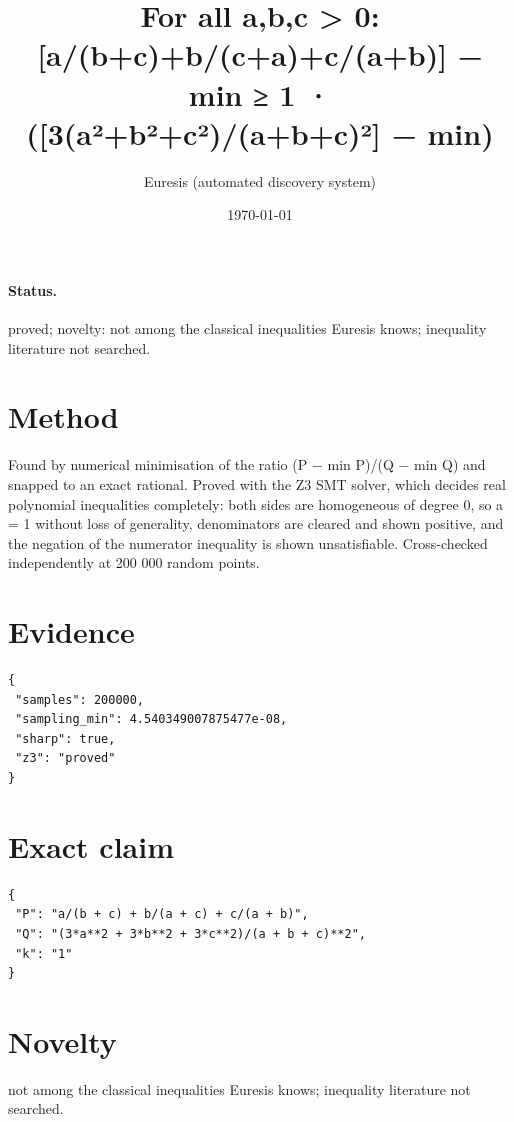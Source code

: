 \documentclass[11pt]{article}
\title{For all a,b,c > 0:  [a/(b+c)+b/(c+a)+c/(a+b)] − min  ≥  1 · ([3(a²+b²+c²)/(a+b+c)²] − min)}
\author{Euresis (automated discovery system)}
\date{\today}
\begin{document}
\maketitle
\paragraph{Status.} proved; novelty: not among the classical inequalities Euresis knows; inequality literature not searched.
\section{Method}
Found by numerical minimisation of the ratio (P − min P)/(Q − min Q) and snapped to an exact rational. Proved with the Z3 SMT solver, which decides real polynomial inequalities completely: both sides are homogeneous of degree 0, so a = 1 without loss of generality, denominators are cleared and shown positive, and the negation of the numerator inequality is shown unsatisfiable. Cross-checked independently at 200 000 random points.
\section{Evidence}
\begin{verbatim}
{
 "samples": 200000,
 "sampling_min": 4.540349007875477e-08,
 "sharp": true,
 "z3": "proved"
}
\end{verbatim}
\section{Exact claim}
\begin{verbatim}
{
 "P": "a/(b + c) + b/(a + c) + c/(a + b)",
 "Q": "(3*a**2 + 3*b**2 + 3*c**2)/(a + b + c)**2",
 "k": "1"
}
\end{verbatim}
\section{Novelty}
not among the classical inequalities Euresis knows; inequality literature not searched.
\end{document}
